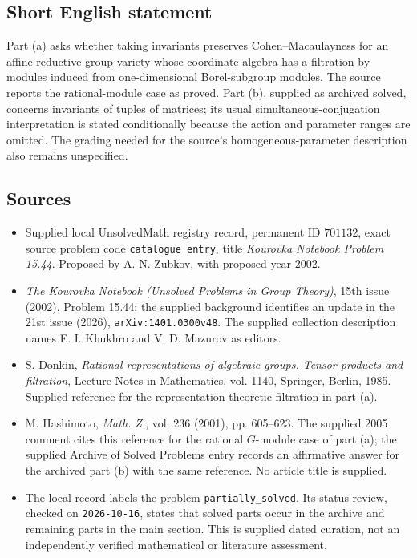 \documentclass[11pt]{article}
\begin{document}
\subsection{Short English statement}
Part (a) asks whether taking invariants preserves Cohen--Macaulayness for an affine reductive-group variety whose coordinate algebra has a filtration by modules induced from one-dimensional Borel-subgroup modules. The source reports the rational-module case as proved. Part (b), supplied as archived solved, concerns invariants of tuples of matrices; its usual simultaneous-conjugation interpretation is stated conditionally because the action and parameter ranges are omitted. The grading needed for the source's homogeneous-parameter description also remains unspecified.
\subsection{Sources}
\begin{itemize}
\item Supplied local UnsolvedMath registry record, permanent ID \(701132\), exact source problem code \texttt{catalogue entry}, title \emph{Kourovka Notebook Problem 15.44}. Proposed by A. N. Zubkov, with proposed year 2002.
\item \emph{The Kourovka Notebook (Unsolved Problems in Group Theory)}, 15th issue (2002), Problem 15.44; the supplied background identifies an update in the 21st issue (2026), \texttt{arXiv:1401.0300v48}. The supplied collection description names E. I. Khukhro and V. D. Mazurov as editors.
\item S. Donkin, \emph{Rational representations of algebraic groups. Tensor products and filtration}, Lecture Notes in Mathematics, vol. 1140, Springer, Berlin, 1985. Supplied reference for the representation-theoretic filtration in part (a).
\item M. Hashimoto, \emph{Math. Z.}, vol. 236 (2001), pp. 605--623. The supplied 2005 comment cites this reference for the rational \(G\)-module case of part (a); the supplied Archive of Solved Problems entry records an affirmative answer for the archived part (b) with the same reference. No article title is supplied.
\item The local record labels the problem \texttt{partially\_solved}. Its status review, checked on \texttt{2026-10-16}, states that solved parts occur in the archive and remaining parts in the main section. This is supplied dated curation, not an independently verified mathematical or literature assessment.
\end{itemize}
\end{document}
